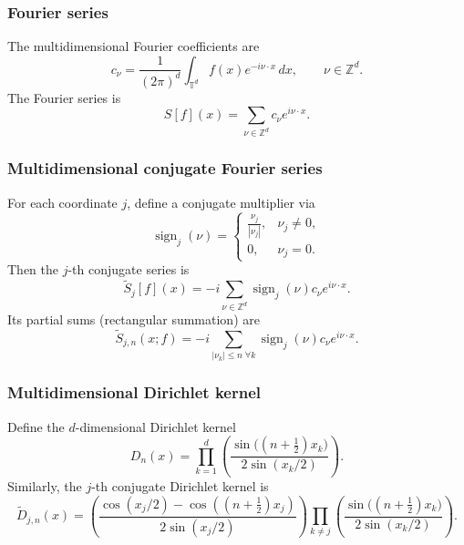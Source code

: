\documentclass{amsart}
\theoremstyle{definition}
\theoremstyle{remark}
\numberwithin{equation}{section}
\begin{document}
\subsubsection*{Fourier series}
The multidimensional Fourier coefficients are
\begin{equation*}
  c_{\nu}=\frac{1}{(2\pi)^d}\int_{\mathbb{T}^d} f(x)e^{-i\nu\cdot x}\,dx,\qquad 
  \nu\in\mathbb{Z}^d.
\end{equation*}
The Fourier series is
\begin{equation*}
  S[f](x)=\sum_{\nu\in\mathbb{Z}^d} c_{\nu}e^{i\nu\cdot x}.
\end{equation*}

\subsubsection*{Multidimensional conjugate Fourier series}
For each coordinate \(j\), define a conjugate multiplier via
\begin{equation*}
  \operatorname{sign}_j(\nu)=\begin{cases} 
    \frac{\nu_j}{|\nu_j|}, & \nu_j\ne 0,\\[2mm]
    0,& \nu_j=0.
  \end{cases}
\end{equation*}
Then the \(j\)-th conjugate series is
\begin{equation*}
  \widetilde S_j[f](x)
     =-i\sum_{\nu\in\mathbb{Z}^d}\operatorname{sign}_j(\nu)c_{\nu}e^{i\nu\cdot x}.
\end{equation*}
Its partial sums (rectangular summation) are
\begin{equation*}
  \widetilde S_{j,n}(x;f)
  =-i\!\!\!\sum_{|\nu_k|\le n\;\forall k}\!\!\!
  \operatorname{sign}_j(\nu)c_{\nu}e^{i\nu\cdot x}.
\end{equation*}

\subsubsection*{Multidimensional Dirichlet kernel}
Define the \(d\)-dimensional Dirichlet kernel
\begin{equation*}
  D_n(x)=\prod_{k=1}^{d}\left( \frac{\sin\big((n+\tfrac12)x_k\big)}{2\sin(x_k/2)}\right).
\end{equation*}
Similarly, the \(j\)-th conjugate Dirichlet kernel is
\begin{equation*}
  \widetilde D_{j,n}(x)
  =\left(\frac{\cos(x_j/2)-\cos((n+\tfrac12)x_j)}{2\sin(x_j/2)}\right)
  \prod_{k\ne j}\left( \frac{\sin\big((n+\tfrac12)x_k\big)}{2\sin(x_k/2)}\right).
\end{equation*}
\end{document}
